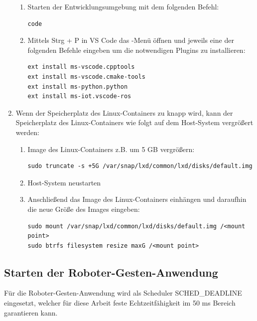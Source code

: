 \begin{enumerate}[label*=\arabic*.]
\begin{enumerate}[label*=\arabic*.]
            \item Starten der Entwicklungsumgebung mit dem folgenden Befehl:
                \begin{lstlisting}[style=bash]
code
                \end{lstlisting}

            \item Mittels Strg + P in VS Code das -Menü öffnen und jeweils eine der folgenden Befehle eingeben um die notwendigen Plugins zu installieren:
                \begin{lstlisting}[style=bash]
ext install ms-vscode.cpptools
ext install ms-vscode.cmake-tools
ext install ms-python.python
ext install ms-iot.vscode-ros
                \end{lstlisting}
        \end{enumerate}

        \item Wenn der Speicherplatz des Linux-Containers zu knapp wird, kann der Speicherplatz des Linux-Containers wie folgt auf dem Host-System vergrößert werden:
            \begin{enumerate}[label*=\arabic*.]
                \item Image des Linux-Containers z.B. um 5 GB vergrößern:
                    \begin{lstlisting}[style=bash]
sudo truncate -s +5G /var/snap/lxd/common/lxd/disks/default.img
                    \end{lstlisting}

                \item Host-System neustarten

                \item Anschließend das Image des Linux-Containers einhängen und daraufhin die neue Größe des Images eingeben:
                    \begin{lstlisting}[style=bash]
sudo mount /var/snap/lxd/common/lxd/disks/default.img /<mount point>
sudo btrfs filesystem resize maxG /<mount point>
                    \end{lstlisting}
            \end{enumerate}
\end{enumerate}


\subsection{Starten der Roboter-Gesten-Anwendung}
Für die Roboter-Gesten-Anwendung wird als Scheduler SCHED\_DEADLINE eingesetzt, welcher für diese Arbeit feste Echtzeitfähigkeit im 50 ms Bereich garantieren kann.

